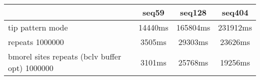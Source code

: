 \begin{tabular}{|l|c|c|c|}
\hline
 & seq59 & seq128 & seq404  \\
\hline
tip pattern mode &  14440ms &  165804ms &  231912ms\\
\hline
repeats 1000000 &  3505ms &  29303ms &  23626ms\\
\hline
bmorel sites repeats (bclv buffer opt) 1000000 &  3101ms &  25768ms &  19256ms\\
\hline
\end{tabular}
